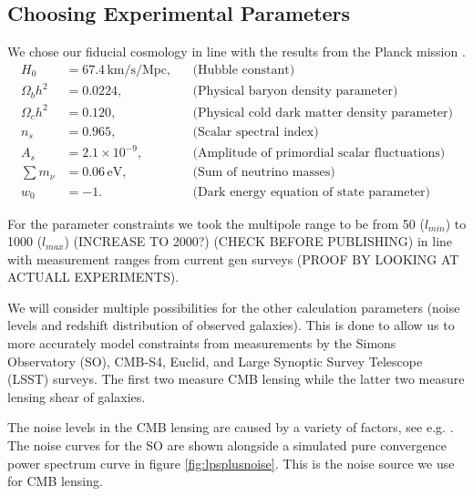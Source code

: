 \documentclass[11pt]{article} %
\begin{document}
\subsection{Choosing Experimental Parameters}
We chose our fiducial cosmology in line with the results from the Planck mission \cite{planckresults}.
\begin{align*}
    H_0 &= 67.4 \, \text{km/s/Mpc}, && \text{(Hubble constant)} \\
    \Omega_b h^2 &= 0.0224, && \text{(Physical baryon density parameter)} \\
    \Omega_c h^2 &= 0.120, && \text{(Physical cold dark matter density parameter)} \\
    n_s &= 0.965, && \text{(Scalar spectral index)} \\
    A_s &= 2.1 \times 10^{-9}, && \text{(Amplitude of primordial scalar fluctuations)} \\
    \sum m_\nu &= 0.06 \, \text{eV}, && \text{(Sum of neutrino masses)} \\
    w_0 &= -1. && \text{(Dark energy equation of state parameter)}
\end{align*}

For the parameter constraints we took the multipole range to be from 50 ($l_{min}$) to 1000 ($l_{max}$) (INCREASE TO 2000?) (CHECK BEFORE PUBLISHING) in line with measurement ranges from current gen surveys (PROOF BY LOOKING AT ACTUALL EXPERIMENTS).

We will consider multiple possibilities for the other calculation parameters (noise levels and redshift distribution of observed galaxies). This is done to allow us to more accurately model constraints from measurements by the Simons Observatory (SO), CMB-S4, Euclid, and Large Synoptic Survey Telescope (LSST) surveys. The first two measure CMB lensing while the latter two measure lensing shear of galaxies.

The noise levels in the CMB lensing are caused by a variety of factors, see e.g. \cite{cmblensingestimator}. The noise curves for the SO are shown alongside a simulated pure convergence power spectrum curve in figure \ref{fig:lpsplusnoise}. This is the noise source we use for CMB lensing.
\end{document}
